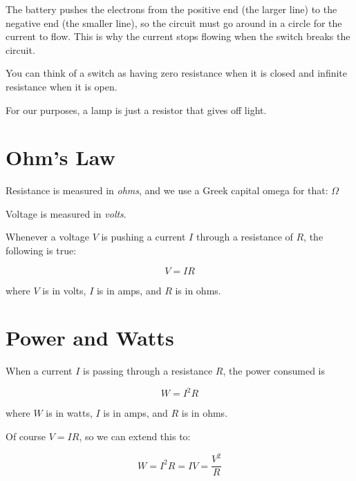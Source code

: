 The battery pushes the electrons from the positive end (the larger line) to the negative end (the smaller line), so the circuit must go around in a circle for the current to flow. This is why the current stops flowing when the switch breaks the circuit.

You can think of a switch as having zero resistance when it is closed and infinite resistance when it is open.


For our purposes, a lamp is just a resistor that gives off light.

\section{Ohm's Law}

Resistance is measured in \textit{ohms}, and we use a Greek capital omega for that: $\Omega$  

Voltage is measured in
\textit{volts}.

\begin{mdframed}[style=important, frametitle={Ohm's Law}]
  Whenever a voltage $V$ is pushing a current $I$ through a resistance of $R$, the following is true:

  $$V = IR$$

  where $V$ is in volts, $I$ is in amps, and $R$ is in ohms.
\end{mdframed}

\section{Power and Watts}

\begin{mdframed}[style=important, frametitle={Joule's Law}]

  When a current $I$ is passing through a resistance $R$, the power consumed is
  
  $$W = I^2 R$$

  where $W$ is in watts, $I$ is in amps, and $R$ is in ohms.
\end{mdframed}

Of course $V = IR$, so we can extend this to:

$$W = I^2 R = I V = \frac{V^2}{R}$$

